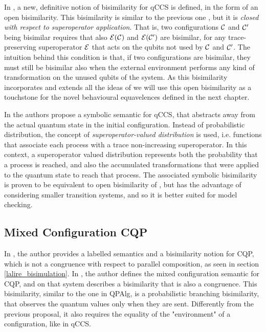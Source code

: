 In \cite{dengOpenBisimulationQuantum2012}, a new, definitive notion of bisimilarity for qCCS is defined, in the form of an open bisimilarity. This bisimilarity is similar to the previous one \cite{fengBisimulationQuantumProcesses2012}, but it is \textit{closed with respect to superoperator application}. That is, two configurations $\mathcal{C}$ and $\mathcal{C}'$ being bisimilar requires that also $\mathcal{E}(\mathcal{C})$ and $\mathcal{E}(\mathcal{C}')$ are bisimilar, for any trace-preserving superoperator $\mathcal{E}$ that acts on the qubits not used by $\mathcal{C}$ and $\mathcal{C}'$. The intuition behind this condition is that, if two configurations are bisimilar, they must still be bisimilar also when the external environment performs any kind of transformation on the unused qubits of the system. As this bisimilarity incorporates and extends all the ideas of \cite{fengBisimulationQuantumProcesses2012, yingAlgebraQuantumProcesses2010, fengBisimulationQuantumProcesses2012} we will use this open bisimilarity as a touchstone for the novel behavioural equavelences defined in the next chapter.


In \cite{fengSymbolicBisimulationQuantum2014} the authors propose a symbolic semantic for qCCS, that abstracts away from the actual quantum state in the initial configuration. Instead of probabilistic distribution, the concept of \textit{superoperator-valued distribution} is used, i.e. functions that associate each process with a trace non-increasing superoperator. In this context, a superoperator valued distribution represents both the probability that a process is reached, and also the accumulated transformations that were applied to the quantum state to reach that process. The associated symbolic bisimilarity is proven to be equivalent to open bisimilarity of \cite{dengOpenBisimulationQuantum2012}, but has the advantage of considering smaller transition systems, and so it is better suited for model checking.  


\subsection{Mixed Configuration CQP}


In \cite{davidsonFormalVerificationTechniques2012}, the author provides a labelled semantics and a bisimilarity notion for CQP, which	is not a congruence with respect to parallel composition, as seen in section \ref{lalire_bisimulation}. In \cite{davidsonFormalVerificationTechniques2012}, the author defines the mixed configuration semantic for CQP, and on that system describes a bisimilarity that is also a congruence. This bisimilarity, similar to the one in QPAlg, is a probabilistic branching bisimilarity, that observes the quantum values only when they are sent. Differently from the previous proposal, it also requires the equality of the "environment" of a configuration, like in qCCS.


